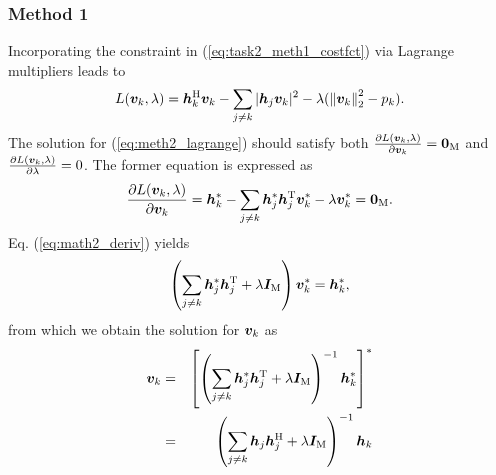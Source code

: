 \documentclass[10pt,a4paper]{article}
\begin{document}
\subsubsection*{Method 1}
Incorporating the constraint in (\ref{eq:task2_meth1_costfct}) via Lagrange multipliers leads to
\begin{equation} \label{eq:meth2_lagrange}
L (\bm{v}_{k}, \lambda) = \bm{h}_{k}^{\operatorname{H}} \bm{v}_{k} - \sum_{j \neq k} \vert \bm{h}_{j} \bm{v}_{k} \vert^{2} - \lambda (\left\lVert\bm{v}_{k}\right\rVert_{2}^{2} - p_{k} ).
\end{equation}
The solution for (\ref{eq:meth2_lagrange}) should satisfy both $\frac{ \partial L ( \bm{v}_{k}, \lambda ) }{ \partial \bm{v}_{k} } = \bm{0}_{\operatorname{M}}$ and  $\frac{ \partial L ( \bm{v}_{k}, \lambda ) }{ \partial \lambda } = 0$. The former equation is expressed as 
\begin{equation} \label{eq:math2_deriv}
\frac{ \partial L ( \bm{v}_{k}, \lambda ) }{ \partial \bm{v}_{k} } = \bm{h}_{k}^{*} - \sum_{j \neq k} \bm{h}_{j}^{*} \bm{h}_{j}^{\operatorname{T}} \bm{v}_{k}^{*} - \lambda \bm{v}_{k}^{*} = \bm{0}_{\operatorname{M}}.
\end{equation} 
Eq. (\ref{eq:math2_deriv}) yields 
\begin{equation}
\left( \sum_{j \neq k} \bm{h}_{j}^{*} \bm{h}_{j}^{\operatorname{T}} + \lambda \bm{I}_{ \operatorname{M} } \right)  \bm{v}_{k} ^{*} =  \bm{h}_{k} ^{*},
\end{equation}
from which we obtain the solution for $\bm{v}_{k}$ as
\begin{equation}
\begin{aligned}
\bm{v}_{k} & = & \left[ \left( \sum_{j \neq k} \bm{h}_{j}^{*} \bm{h}_{j}^{\operatorname{T}} + \lambda \bm{I}_{ \operatorname{M} } \right)^{-1}  \bm{h}_{k}^{*} \right]^{*} \\
 & = & \left( \sum_{j \neq k} \bm{h}_{j} \bm{h}_{j}^{\operatorname{H}} + \lambda \bm{I}_{ \operatorname{M} } \right)^{-1} \bm{h}_{k}
\end{aligned}
\end{equation}
\end{document}
